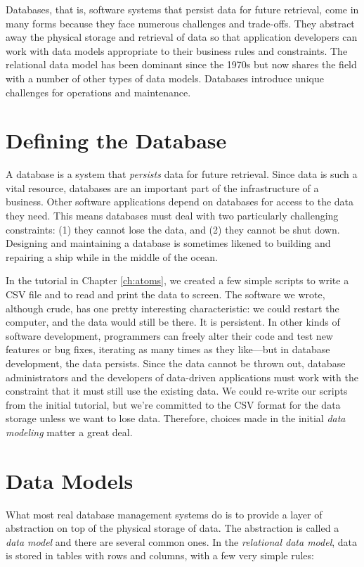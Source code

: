 \documentclass[11pt]{book}
\newcommand{\term}[1]{\emph{#1}} %
\begin{document}
Databases, that is, software systems that persist data for future retrieval, come in many forms because they face numerous challenges and trade-offs.  They abstract away the physical storage and retrieval of data so that application developers can work with data models appropriate to their business rules and constraints.  The relational data model has been dominant since the 1970s but now shares the field with a number of other types of data models.  Databases introduce unique challenges for operations and maintenance.

\section{Defining the Database}
A database is a system that \term{persists} data for future retrieval.  Since data is such a vital resource, databases are an important part of the infrastructure of a business.  Other software applications depend on databases for access to the data they need.  This means databases must deal with two particularly challenging constraints: (1) they cannot lose the data, and (2) they cannot be shut down.  Designing and maintaining a database is sometimes likened to building and repairing a ship while in the middle of the ocean.

In the tutorial in Chapter \ref{ch:atoms}, we created a few simple scripts to write a CSV file and to read and print the data to screen.  The software we wrote, although crude, has one pretty interesting characteristic: we could restart the computer, and the data would still be there.  It is persistent.  In other kinds of software development, programmers can freely alter their code and test new features or bug fixes, iterating as many times as they like---but in database development, the data persists.  Since the data cannot be thrown out, database administrators and the developers of data-driven applications must work with the constraint that it must still use the existing data.  We could re-write our scripts from the initial tutorial, but we're committed to the CSV format for the data storage unless we want to lose data.  Therefore, choices made in the initial \term{data modeling} matter a great deal.

\section{Data Models}
What most real database management systems do is to provide a layer of abstraction on top of the physical storage of data.  The abstraction is called a \term{data model} and there are several common ones.  In the \term{relational data model}, data is stored in tables with rows and columns, with a few very simple rules:
\end{document}

